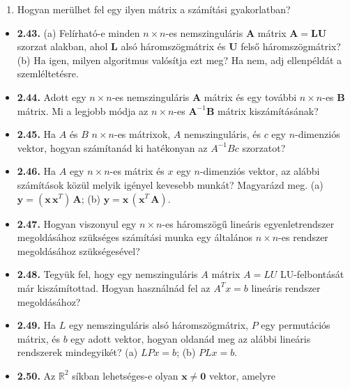 \documentclass[
  magyar,
  11pt]{article}
\providecommand{\tightlist}{%
  \setlength{\itemsep}{0pt}\setlength{\parskip}{0pt}}
\providecommand{\boldsymbol}[1]{\mathbf{#1}}
\begin{document}
\begin{enumerate}
\def\labelenumi{(\alph{enumi})}
\setcounter{enumi}{1}
\tightlist
\item
  Hogyan merülhet fel egy ilyen mátrix a számítási gyakorlatban?
\end{enumerate}

\begin{itemize}
\tightlist
\item
  \textbf{2.43.} (a) Felírható-e minden \(n \times n\)-es nemszinguláris
  \(\boldsymbol{A}\) mátrix
  \(\boldsymbol{A} = \boldsymbol{L}\boldsymbol{U}\) szorzat alakban,
  ahol \(\boldsymbol{L}\) alsó háromszögmátrix és \(\boldsymbol{U}\)
  felső háromszögmátrix? (b) Ha igen, milyen algoritmus valósítja ezt
  meg? Ha nem, adj ellenpéldát a szemléltetésre.
\item
  \textbf{2.44.} Adott egy \(n \times n\)-es nemszinguláris
  \(\boldsymbol{A}\) mátrix és egy további \(n \times n\)-es
  \(\boldsymbol{B}\) mátrix. Mi a legjobb módja az \(n \times n\)-es
  \(\boldsymbol{A}^{-1}\boldsymbol{B}\) mátrix kiszámításának?
\item
  \textbf{2.45.} Ha \(A\) és \(B\) \(n \times n\)-es mátrixok, \(A\)
  nemszinguláris, és \(c\) egy \(n\)-dimenziós vektor, hogyan számítanád
  ki hatékonyan az \(A^{-1}Bc\) szorzatot?
\item
  \textbf{2.46.} Ha \(A\) egy \(n \times n\)-es mátrix és \(x\) egy
  \(n\)-dimenziós vektor, az alábbi számítások közül melyik igényel
  kevesebb munkát? Magyarázd meg. (a)
  \(\boldsymbol{y} = (\boldsymbol{x}\,\boldsymbol{x}^T)\,\boldsymbol{A}\);
  (b)
  \(\boldsymbol{y} = \boldsymbol{x}\,(\boldsymbol{x}^T\,\boldsymbol{A})\).
\item
  \textbf{2.47.} Hogyan viszonyul egy \(n \times n\)-es háromszögű
  lineáris egyenletrendszer megoldásához szükséges számítási munka egy
  általános \(n \times n\)-es rendszer megoldásához szükségesével?
\item
  \textbf{2.48.} Tegyük fel, hogy egy nemszinguláris \(A\) mátrix
  \(A = LU\) LU-felbontását már kiszámítottad. Hogyan használnád fel az
  \(A^T x = b\) lineáris rendszer megoldásához?
\item
  \textbf{2.49.} Ha \(L\) egy nemszinguláris alsó háromszögmátrix, \(P\)
  egy permutációs mátrix, és \(b\) egy adott vektor, hogyan oldanád meg
  az alábbi lineáris rendszerek mindegyikét? (a) \(LPx = b\); (b)
  \(PLx = b\).
\item
  \textbf{2.50.} Az \(\mathbb{R}^2\) síkban lehetséges-e olyan
  \(\boldsymbol{x} \neq \boldsymbol{0}\) vektor, amelyre

\end{itemize}
\end{document}
